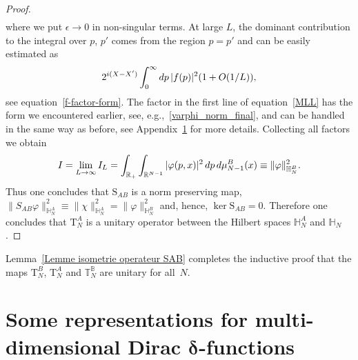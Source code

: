 \documentclass[11pt]{article}
\numberwithin{equation}{section}
\numberwithin{equation}{section}
\begin{document}
\begin{proof}
\begin{align}
\end{align}
where we put $\epsilon\to 0$ in non-singular terms. At large $L$, the dominant contribution to the integral over $p$, $p'$ comes from the
region $p=p'$ and can be easily estimated as
\begin{gather*}
2^{{\rm i}(X-X')}\int_0^\infty {\rm d}p \,|f(p)|^2 (1+O(1/ L)),
\end{gather*}
see equation~\eqref{f-factor-form}. The factor in the first line of equation~\eqref{MLL} has the form we encountered earlier, see,
e.g.,~\eqref{varphi_norm_final}, and can be handled in the same way as before, see Appendix~\ref{Appendix identite fct delat evoluee} for
more details. Collecting all factors we obtain
\begin{gather*}
I=\lim_{L\to\infty} I_L=\int_{\mathbb R_+} \int_{\mathbb R^{N-1}} |\varphi(p,x)|^2 \, {\rm d}p\,{\rm d}\mu_{N-1}^B(x)\equiv \|\varphi\|^2_{\mathbb H_{N}^B}.
\end{gather*}
Thus one concludes that $\mathrm S_{AB}$ is a norm preserving map, $\|S_{AB}\varphi\|^2_{\mathbb H_N^A}\equiv\|\chi\|^2_{\mathbb H_N^A}=
\|\varphi\|^2_{\mathbb H_N^B}$ and, hence, $\ker \mathrm S_{AB}=0$. Therefore one concludes that $\mathrm T_{N}^A$ is a unitary operator
between the Hilbert spaces $\mathbb H_{N}^A$ and $\mathbb H_N$.
\end{proof}

Lemma~\ref{Lemme isometrie operateur SAB} completes the inductive proof that the maps $\mathrm T_N^B$, $\mathrm T_N^A$ and $\mathbb
T_N^{\mathbb B}$ are unitary for all~$N$.


\appendix

\section[Some representations for multi-dimensional Dirac delta-functions]
{Some representations for multi-dimensional Dirac $\boldsymbol{\delta}$-functions}
\label{Appendix identite fct delat evoluee}
\end{document}
